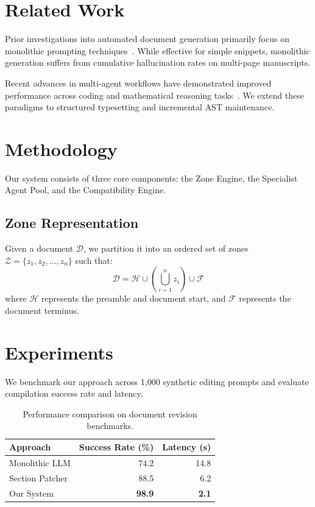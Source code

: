 \documentclass[10pt,twocolumn]{article}
\begin{document}
\section{Related Work}
Prior investigations into automated document generation primarily focus on monolithic prompting techniques~\cite{lamport1994latex,knuth1984texbook}. While effective for simple snippets, monolithic generation suffers from cumulative hallucination rates on multi-page manuscripts.

Recent advances in multi-agent workflows have demonstrated improved performance across coding and mathematical reasoning tasks~\cite{vaswani2017attention}. We extend these paradigms to structured typesetting and incremental AST maintenance.

\section{Methodology}
Our system consists of three core components: the Zone Engine, the Specialist Agent Pool, and the Compatibility Engine.

\subsection{Zone Representation}
Given a document $\mathcal{D}$, we partition it into an ordered set of zones $\mathcal{Z} = \{z_1, z_2, \dots, z_n\}$ such that:
\begin{equation}
\mathcal{D} = \mathcal{H} \cup \left( \bigcup_{i=1}^n z_i \right) \cup \mathcal{F}
\end{equation}
where $\mathcal{H}$ represents the preamble and document start, and $\mathcal{F}$ represents the document terminus.

\section{Experiments}
We benchmark our approach across 1,000 synthetic editing prompts and evaluate compilation success rate and latency.

\begin{table}[ht]
\centering
\caption{Performance comparison on document revision benchmarks.}
\label{tab:results}
\begin{tabular}{lrr}
\toprule
\textbf{Approach} & \textbf{Success Rate (\%)} & \textbf{Latency (s)} \\
\midrule
Monolithic LLM   & 74.2 & 14.8 \\
Section Patcher  & 88.5 & 6.2 \\
Our System       & \textbf{98.9} & \textbf{2.1} \\
\bottomrule
\end{tabular}
\end{table}
\end{document}
